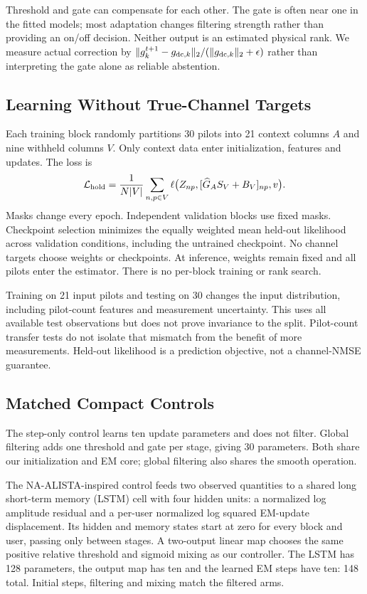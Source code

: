 \documentclass[10pt,journal,letterpaper]{IEEEtran}
\begin{document}
Threshold and gate can compensate for each other. The gate is often near one in the fitted models; most adaptation changes filtering strength rather than providing an on/off decision. Neither output is an estimated physical rank. We measure actual correction by $\|g_k^{t+1}-g_{{\rm dc},k}\|_2/(\|g_{{\rm dc},k}\|_2+\epsilon)$ rather than interpreting the gate alone as reliable abstention.

\subsection{Learning Without True-Channel Targets}
Each training block randomly partitions 30 pilots into 21 context columns $A$ and nine withheld columns $V$. Only context data enter initialization, features and updates. The loss is
\begin{equation}
 \mathcal L_{\rm hold}=\frac{1}{N|V|}\sum_{n,p\in V}
 \ell\big(Z_{np},[\widehat G_A S_V+B_V]_{np},v\big).
\end{equation}
Masks change every epoch. Independent validation blocks use fixed masks. Checkpoint selection minimizes the equally weighted mean held-out likelihood across validation conditions, including the untrained checkpoint. No channel targets choose weights or checkpoints. At inference, weights remain fixed and all pilots enter the estimator. There is no per-block training or rank search.

Training on 21 input pilots and testing on 30 changes the input distribution, including pilot-count features and measurement uncertainty. This uses all available test observations but does not prove invariance to the split. Pilot-count transfer tests do not isolate that mismatch from the benefit of more measurements. Held-out likelihood is a prediction objective, not a channel-NMSE guarantee.

\subsection{Matched Compact Controls}
The step-only control learns ten update parameters and does not filter. Global filtering adds one threshold and gate per stage, giving 30 parameters. Both share our initialization and EM core; global filtering also shares the smooth operation.

The NA-ALISTA-inspired control feeds two observed quantities to a shared long short-term memory (LSTM) cell with four hidden units: a normalized log amplitude residual and a per-user normalized log squared EM-update displacement. Its hidden and memory states start at zero for every block and user, passing only between stages. A two-output linear map chooses the same positive relative threshold and sigmoid mixing as our controller. The LSTM has 128 parameters, the output map has ten and the learned EM steps have ten: 148 total. Initial steps, filtering and mixing match the filtered arms.
\end{document}
